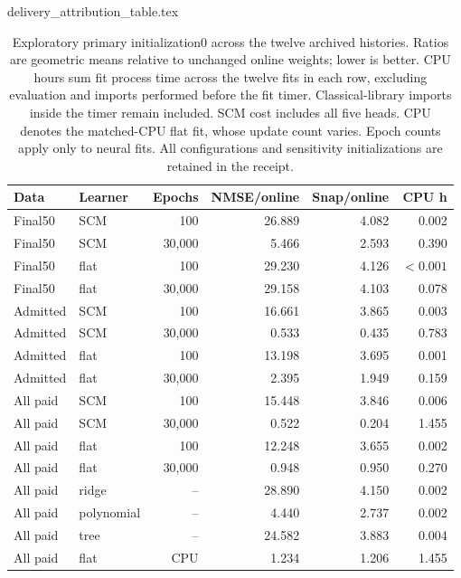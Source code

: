 \begin{filecontents*}[overwrite]{delivery_attribution_table.tex}
\begin{table}[ht]
\centering\small
\begin{tabular}{llrrrr}
\toprule
Data & Learner & Epochs & NMSE/online & Snap/online & CPU h\\
\midrule
Final50 & SCM & 100 & 26.889 & 4.082 & 0.002\\
Final50 & SCM & 30,000 & 5.466 & 2.593 & 0.390\\
Final50 & flat & 100 & 29.230 & 4.126 & $<0.001$\\
Final50 & flat & 30,000 & 29.158 & 4.103 & 0.078\\
Admitted & SCM & 100 & 16.661 & 3.865 & 0.003\\
Admitted & SCM & 30,000 & 0.533 & 0.435 & 0.783\\
Admitted & flat & 100 & 13.198 & 3.695 & 0.001\\
Admitted & flat & 30,000 & 2.395 & 1.949 & 0.159\\
All paid & SCM & 100 & 15.448 & 3.846 & 0.006\\
All paid & SCM & 30,000 & 0.522 & 0.204 & 1.455\\
All paid & flat & 100 & 12.248 & 3.655 & 0.002\\
All paid & flat & 30,000 & 0.948 & 0.950 & 0.270\\
All paid & ridge & -- & 28.890 & 4.150 & 0.002\\
All paid & polynomial & -- & 4.440 & 2.737 & 0.002\\
All paid & tree & -- & 24.582 & 3.883 & 0.004\\
All paid & flat & CPU & 1.234 & 1.206 & 1.455\\
\bottomrule
\end{tabular}
\caption{Exploratory primary initialization0 across the twelve archived histories. Ratios are geometric means relative to unchanged online weights; lower is better. CPU hours sum fit process time across the twelve fits in each row, excluding evaluation and imports performed before the fit timer. Classical-library imports inside the timer remain included. SCM cost includes all five heads. CPU denotes the matched-CPU flat fit, whose update count varies. Epoch counts apply only to neural fits. All configurations and sensitivity initializations are retained in the receipt.}
\label{tab:attribution}
\end{table}
\end{filecontents*}

